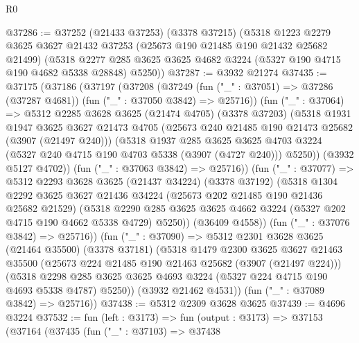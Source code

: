 \begin{lexlean}{R0}
\begin{coremodule}
@37286 := @37252
    (@21433 @37253)
    (@3378 @37215)
    (@5318
      @1223
      @2279
      @3625
      @3627
      @21432
      @37253
      (@25673 @190 @21485 @190 @21432 @25682 @21499)
      (@5318 @2277 @285 @3625 @3625 @4682 @3224 (@5327 @190 @4715 @190 @4682 @5338 @28848) @5250))
@37287 := @3932 @21274
@37435 := @37175
    (@37186
      (@37197
        (@37208
          (@37249
            (fun ("_" : @37051) => @37286 (@37287 @4681))
            (fun ("_" : @37050 @3842) => @25716))
          (fun ("_" : @37064) =>
          @5312
            @2285
            @3628
            @3625
            (@21474 @4705)
            (@3378 @37203)
            (@5318
              @1931
              @1947
              @3625
              @3627
              @21473
              @4705
              (@25673 @240 @21485 @190 @21473 @25682 (@3907 (@21497 @240)))
              (@5318
                @1937
                @285
                @3625
                @3625
                @4703
                @3224
                (@5327 @240 @4715 @190 @4703 @5338 (@3907 (@4727 @240)))
                @5250))
            (@3932 @5127 @4702))
          (fun ("_" : @37063 @3842) => @25716))
        (fun ("_" : @37077) =>
        @5312
          @2293
          @3628
          @3625
          (@21437 @34224)
          (@3378 @37192)
          (@5318
            @1304
            @2292
            @3625
            @3627
            @21436
            @34224
            (@25673 @202 @21485 @190 @21436 @25682 @21529)
            (@5318
              @2290
              @285
              @3625
              @3625
              @4662
              @3224
              (@5327 @202 @4715 @190 @4662 @5338 @4729)
              @5250))
          (@36409 @4558))
        (fun ("_" : @37076 @3842) => @25716))
      (fun ("_" : @37090) =>
      @5312
        @2301
        @3628
        @3625
        (@21464 @35500)
        (@3378 @37181)
        (@5318
          @1479
          @2300
          @3625
          @3627
          @21463
          @35500
          (@25673 @224 @21485 @190 @21463 @25682 (@3907 (@21497 @224)))
          (@5318
            @2298
            @285
            @3625
            @3625
            @4693
            @3224
            (@5327 @224 @4715 @190 @4693 @5338 @4787)
            @5250))
        (@3932 @21462 @4531))
      (fun ("_" : @37089 @3842) => @25716))
@37438 := @5312 @2309 @3628 @3625
@37439 := @4696 @3224
@37532 := fun (left : @3173) =>
  fun (output : @3173) =>
  @37153
    (@37164
      (@37435
        (fun ("_" : @37103) =>
        @37438

\end{coremodule}
\end{lexlean}
